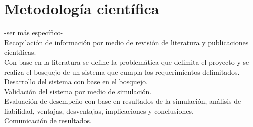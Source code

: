 \section {Metodología científica}
-ser más específico-\\
Recopilación de información por medio de revisión de literatura y publicaciones científicas.\\
Con base en la literatura se define la problemática que delimita el proyecto y se realiza el bosquejo de un sistema que cumpla los requerimientos delimitados.\\
Desarrollo del sistema con base en el bosquejo.\\
Validación del sistema por medio de simulación.\\
Evaluación de desempeño con base en resultados de la simulación, análisis de fiabilidad, ventajas, desventajas, implicaciones y conclusiones.\\
Comunicación de resultados.